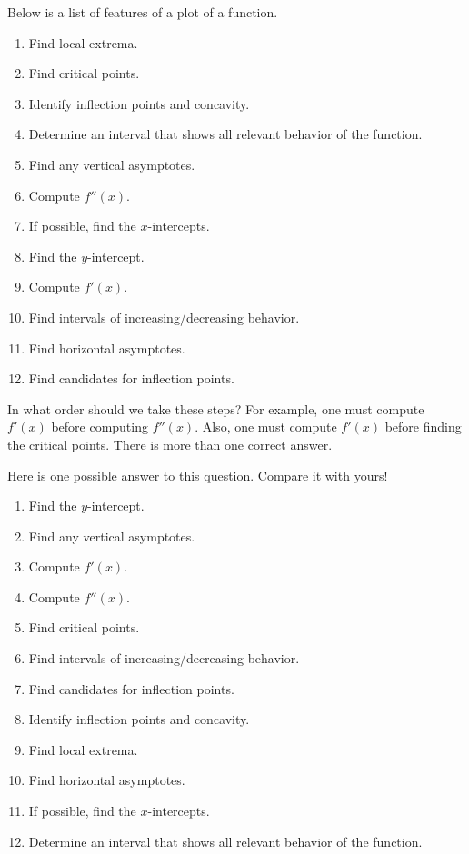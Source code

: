 \documentclass{ximera}
\begin{document}
\begin{problem}%
  Below is a list of features of a plot of a function.
  \begin{enumerate}
  \item Find local extrema.
  \item Find critical points.
  \item Identify inflection points and concavity.
  \item Determine an interval that shows all relevant behavior of the function. 
  \item Find any vertical asymptotes.
  \item Compute $f''(x)$.
  \item If possible, find the $x$-intercepts.
  \item Find the $y$-intercept.
  \item Compute $f'(x)$.
  \item Find intervals of increasing/decreasing behavior.
  \item Find horizontal asymptotes.
  \item Find candidates for inflection points.
 \end{enumerate}
  In what order should we take these steps? For example, one must compute
   $f'(x)$ before computing $f''(x)$. Also, one must compute $f'(x)$ before 
   finding the critical points. There is more than one correct answer.
  \begin{freeResponse}
  Here is one possible answer to this question.  Compare it with yours!
    \begin{enumerate}
  \item Find the $y$-intercept.
  \item Find any vertical asymptotes.
  \item Compute $f'(x)$.
  \item Compute $f''(x)$.
  \item Find critical points.
  \item Find intervals of increasing/decreasing behavior.
  \item Find candidates for inflection points.
  \item Identify inflection points and concavity.
  \item Find local extrema.
  \item Find horizontal asymptotes.
  \item If possible, find the $x$-intercepts.
  \item Determine an interval that shows all relevant behavior of the function. 
  \end{enumerate}
  \end{freeResponse}
\end{problem}



\end{document}
